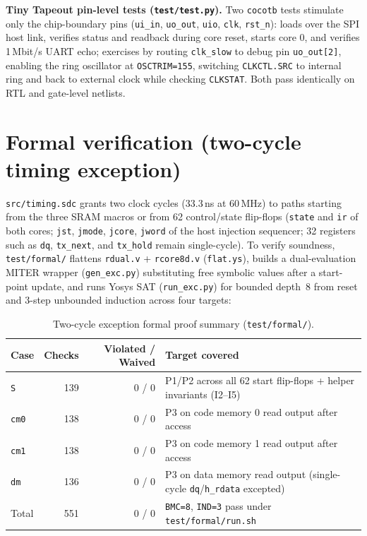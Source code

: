 \documentclass[10pt,a4paper]{article}
\begin{document}
\textbf{Tiny Tapeout pin-level tests (\texttt{test/test.py}).} Two \texttt{cocotb} tests stimulate only the
chip-boundary pins (\texttt{ui\_in}, \texttt{uo\_out}, \texttt{uio}, \texttt{clk}, \texttt{rst\_n}):
 loads  over the SPI host link, verifies status
and readback during core reset, starts core 0, and verifies 1\,Mbit/s UART echo; 
exercises  by routing \texttt{clk\_slow} to debug pin \texttt{uo\_out[2]},
enabling the ring oscillator at \texttt{OSCTRIM=155}, switching \texttt{CLKCTL.SRC} to internal ring and back to
external clock while checking \texttt{CLKSTAT}. Both pass identically on RTL and gate-level netlists.

\section{Formal verification (two-cycle timing exception)}\label{sec:formal}

\texttt{src/timing.sdc} grants two clock cycles (33.3\,ns at 60\,MHz) to paths starting from the three SRAM macros
or from 62 control/state flip-flops (\texttt{state} and \texttt{ir} of both cores; \texttt{jst}, \texttt{jmode},
\texttt{jcore}, \texttt{jword} of the host injection sequencer; 32 registers such as \texttt{dq}, \texttt{tx\_next},
and \texttt{tx\_hold} remain single-cycle). To verify soundness, \texttt{test/formal/} flattens \texttt{rdual.v} +
\texttt{rcore8d.v} (\texttt{flat.ys}), builds a dual-evaluation MITER wrapper (\texttt{gen\_exc.py}) substituting
free symbolic values after a start-point update, and runs Yosys SAT (\texttt{run\_exc.py}) for bounded depth~8 from
reset and 3-step unbounded induction across four targets:

\begin{table}[H]
\centering\small
\begin{tabularx}{\linewidth}{@{}lrrL@{}}
\toprule
Case & Checks & Violated / Waived & Target covered \\
\midrule
\texttt{S} & 139 & 0 / 0 & P1/P2 across all 62 start flip-flops + helper invariants (I2--I5) \\
\texttt{cm0} & 138 & 0 / 0 & P3 on code memory 0 read output after access \\
\texttt{cm1} & 138 & 0 / 0 & P3 on code memory 1 read output after access \\
\texttt{dm} & 136 & 0 / 0 & P3 on data memory read output (single-cycle \texttt{dq}/\texttt{h\_rdata} excepted) \\
\midrule
Total & 551 & 0 / 0 & \texttt{BMC=8}, \texttt{IND=3} pass under \texttt{test/formal/run.sh} \\
\bottomrule
\end{tabularx}
\caption{Two-cycle exception formal proof summary (\texttt{test/formal/}).}
\end{table}
\end{document}
